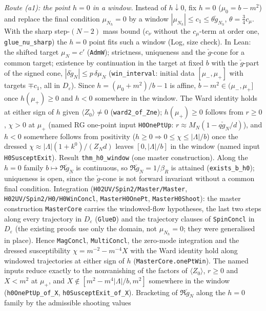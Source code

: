 \documentclass[11pt]{amsart}
\theoremstyle{definition}
\theoremstyle{remark}
\numberwithin{equation}{section}
\newcommand{\avg}[1]{\langle #1\rangle}
\begin{document}
\emph{Route (a1): the point $h=0$ in a window.} Instead of $h\downarrow0$, fix $h=0$ ($\mu_0=b-m^2$) and replace the final
condition $\mu_{N_h}=0$ by a window $|\mu_{N_h}|\le c_1\le\theta\check g_{N_h}$, $\theta=\frac34c_\mu$. With the sharp step-$(N-2)$
mass bound ($c_\nu$ without the $c_\mu$-term at order one, \texttt{glue\_nu\_sharp}) the $h=0$ point fits such a window (Log, size check).
In Lean: the shifted target $\mu_{N}=c'$ (\texttt{AdmW}); strictness, uniqueness and the $\check g$-cone for a common target; existence by
continuation in the target at fixed $b$ with the $\check g$-part of the signed cone, $|\delta\check g_N|\le p\,\delta\mu_N$
(\texttt{win\_interval}: initial data $[\mu_-,\mu_+]$ with targets $\mp c_1$, all in $D_\varepsilon$). Since $h=(\mu_0+m^2)/b-1$ is
affine, $b-m^2\in(\mu_-,\mu_+]$ once $h(\mu_+)\ge0$ and $h<0$ somewhere in the window. The Ward identity holds at either sign of $h$
given $\avg{Z_0}\ne0$ (\texttt{ward2\_of\_Zne}); $h(\mu_+)\ge0$ follows from $r\ge0$, $\chi>0$ at $\mu_+$ (named RG one-point input
\texttt{H0OnePtUp}: $r\approx M_N(1-q\check g_N/d)$), and $h<0$ somewhere follows from positivity ($h\ge0\Rightarrow0\le\chi\le|\Lambda|/b$)
once the dressed $\chi\approx|\Lambda|(1+k^0)/(Z_Nd)$ leaves $[0,|\Lambda|/b]$ in the window (named input \texttt{H0SusceptExit}).
Result \texttt{thm\_h0\_window} (one master construction). Along the $h=0$ family $b\mapsto\Re\check g_N$ is continuous, so
$\Re\check g_N=1/\beta_R$ is attained (\texttt{exists\_b\_h0}); uniqueness is open, since the $\check g$-cone is not forward invariant
without a common final condition.
Integration (\texttt{H02UV/Spin2/Master/Master}, \texttt{H02UV/Spin2/H0/H0WinConcl}, \texttt{MasterH0OnePt}, \texttt{MasterH0Shoot}): the master construction \texttt{MasterCore}
carries the windowed-flow hypotheses, the last two steps along every trajectory in $D_\varepsilon$ (\texttt{GlueD}) and the
trajectory clauses of \texttt{SpinConcl} in $D_\varepsilon$ (the existing proofs use only the domain, not $\mu_{N_h}=0$; they were
generalised in place). Hence \texttt{MagConcl}, \texttt{MultiConcl}, the zero-mode integration and the dressed susceptibility
$\chi=m^{-2}-m^{-4}X$ with the Ward identity hold along windowed trajectories at either sign of $h$
(\texttt{MasterCore.onePtWin}). The named inputs reduce exactly to the nonvanishing of the factors of $\avg{Z_0}$, $r\ge0$
and $X<m^2$ at $\mu_+$, and $X\notin[m^2-m^4|\Lambda|/b,m^2]$ somewhere in the window (\texttt{h0OnePtUp\_of\_X},
\texttt{h0SusceptExit\_of\_X}). Bracketing of $\Re\check g_N$ along the $h=0$ family by the admissible shooting values
\end{document}
